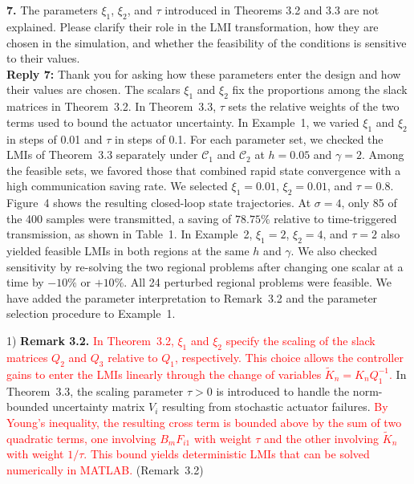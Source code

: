 \documentclass[10pt,fleqn]{article}
\begin{document}
~\\
\\
\textbf{7.} The parameters $\xi_1$, $\xi_2$, and $\tau$ introduced in Theorems 3.2 and 3.3 are not explained. Please clarify their role in the LMI transformation, how they are chosen in the simulation, and whether the feasibility of the conditions is sensitive to their values.
\\[10pt]
\begingroup
\setlength{\parskip}{6pt}
\indent \textbf{Reply 7:} Thank you for asking how these parameters enter the design and how their values are chosen. The scalars $\xi_1$ and $\xi_2$ fix the proportions among the slack matrices in Theorem~3.2. In Theorem~3.3, $\tau$ sets the relative weights of the two terms used to bound the actuator uncertainty. In Example~1, we varied $\xi_1$ and $\xi_2$ in steps of 0.01 and $\tau$ in steps of 0.1. For each parameter set, we checked the LMIs of Theorem~3.3 separately under $\mathcal C_1$ and $\mathcal C_2$ at $h=0.05$ and $\gamma=2$. Among the feasible sets, we favored those that combined rapid state convergence with a high communication saving rate. We selected $\xi_1=0.01$, $\xi_2=0.01$, and $\tau=0.8$. Figure~4 shows the resulting closed-loop state trajectories. At $\sigma=4$, only 85 of the 400 samples were transmitted, a saving of $78.75\%$ relative to time-triggered transmission, as shown in Table~1. In Example~2, $\xi_1=2$, $\xi_2=4$, and $\tau=2$ also yielded feasible LMIs in both regions at the same $h$ and $\gamma$. We also checked sensitivity by re-solving the two regional problems after changing one scalar at a time by $-10\%$ or $+10\%$. All 24 perturbed regional problems were feasible. We have added the parameter interpretation to Remark~3.2 and the parameter selection procedure to Example~1.\par
1) \textbf{Remark 3.2.} \textcolor{red}{In Theorem~3.2, $\xi_1$ and $\xi_2$ specify the scaling of the slack matrices $Q_2$ and $Q_3$ relative to $Q_1$, respectively. This choice allows the controller gains to enter the LMIs linearly through the change of variables $\widetilde K_n=K_nQ_1^{-1}$.} In Theorem~3.3, the scaling parameter $\tau > 0$ is introduced to handle the norm-bounded uncertainty matrix $V_i$ resulting from stochastic actuator failures. \textcolor{red}{By Young's inequality, the resulting cross term is bounded above by the sum of two quadratic terms, one involving $B_mF_{i1}$ with weight $\tau$ and the other involving $\widetilde K_n$ with weight $1/\tau$. This bound yields deterministic LMIs that can be solved numerically in MATLAB.} (Remark~3.2)\par
\end{document}
